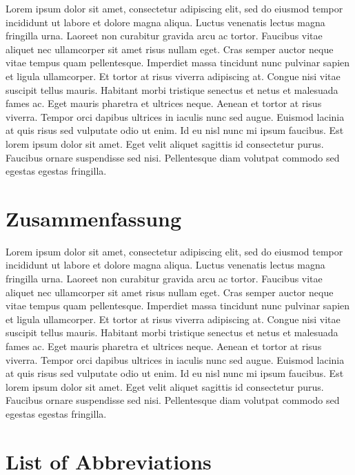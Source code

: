 \documentclass[
]{scrbook}
\begin{document}
Lorem ipsum dolor sit amet, consectetur adipiscing elit, sed do eiusmod tempor incididunt ut labore et dolore magna aliqua. Luctus venenatis lectus magna fringilla urna. Laoreet non curabitur gravida arcu ac tortor. Faucibus vitae aliquet nec ullamcorper sit amet risus nullam eget. Cras semper auctor neque vitae tempus quam pellentesque. Imperdiet massa tincidunt nunc pulvinar sapien et ligula ullamcorper. Et tortor at risus viverra adipiscing at. Congue nisi vitae suscipit tellus mauris. Habitant morbi tristique senectus et netus et malesuada fames ac. Eget mauris pharetra et ultrices neque. Aenean et tortor at risus viverra. Tempor orci dapibus ultrices in iaculis nunc sed augue. Euismod lacinia at quis risus sed vulputate odio ut enim. Id eu nisl nunc mi ipsum faucibus. Est lorem ipsum dolor sit amet. Eget velit aliquet sagittis id consectetur purus. Faucibus ornare suspendisse sed nisi. Pellentesque diam volutpat commodo sed egestas egestas fringilla.

\chapter{Zusammenfassung}\label{zusammenfassung}

Lorem ipsum dolor sit amet, consectetur adipiscing elit, sed do eiusmod tempor incididunt ut labore et dolore magna aliqua. Luctus venenatis lectus magna fringilla urna. Laoreet non curabitur gravida arcu ac tortor. Faucibus vitae aliquet nec ullamcorper sit amet risus nullam eget. Cras semper auctor neque vitae tempus quam pellentesque. Imperdiet massa tincidunt nunc pulvinar sapien et ligula ullamcorper. Et tortor at risus viverra adipiscing at. Congue nisi vitae suscipit tellus mauris. Habitant morbi tristique senectus et netus et malesuada fames ac. Eget mauris pharetra et ultrices neque. Aenean et tortor at risus viverra. Tempor orci dapibus ultrices in iaculis nunc sed augue. Euismod lacinia at quis risus sed vulputate odio ut enim. Id eu nisl nunc mi ipsum faucibus. Est lorem ipsum dolor sit amet. Eget velit aliquet sagittis id consectetur purus. Faucibus ornare suspendisse sed nisi. Pellentesque diam volutpat commodo sed egestas egestas fringilla.

\renewcommand{\baselinestretch}{1.2}\normalsize
\tableofcontents
\renewcommand{\baselinestretch}{1.5}\normalsize

\chapter{List of Abbreviations}\label{acronyms_HEADER_LOA}
\end{document}
